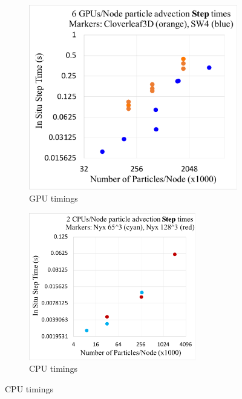 \begin{figure}[t]
\centering
\begin{subfigure}{0.48\textwidth}
\centering
\includegraphics[width=0.8\linewidth]{images/GPU_Step.pdf}
\caption{GPU timings}
\label{fig:gpu_plot}
\end{subfigure}
\hspace{5mm}
\begin{subfigure}{0.48\textwidth}
\centering
\includegraphics[width=0.8\textwidth]{images/CPU_Step.pdf}
\caption{CPU timings}
\label{fig:cpu_plot}
\end{subfigure}
\end{figure}
